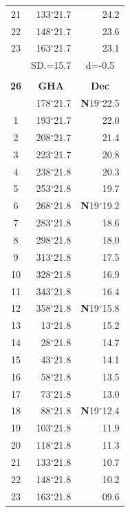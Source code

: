 \documentclass[10pt, a4paper]{report}
\begin{document}
\begin{scriptsize}
\begin{tabular*}{0.2\textwidth}[t]{@{\extracolsep{\fill}}|c|rr|}
21 & 133$^\circ$21.7 & \raisebox{0.24ex}{\boldmath$\cdot$~\boldmath$\cdot$~~}24.2\\
22 & 148$^\circ$21.7 & 23.6\\
23 & 163$^\circ$21.7 & 23.1\\
\hline
\rule{0pt}{2.4ex} & \multicolumn{1}{c}{SD.=15.7} & \multicolumn{1}{c|}{d=-0.5}\\
\hline
\multicolumn{1}{c}{}\\[-0.5ex]\hline
\multicolumn{1}{|c|}{\rule{0pt}{2.6ex}\textbf{26}} & \multicolumn{1}{c}{\textbf{GHA}} & \multicolumn{1}{c|}{\textbf{Dec}}\\
\hline\rule{0pt}{2.6ex}\noindent
0 & 178$^\circ$21.7 & \textbf{N}19$^\circ$22.5\\
1 & 193$^\circ$21.7 & 22.0\\
2 & 208$^\circ$21.7 & 21.4\\
3 & 223$^\circ$21.7 & \raisebox{0.24ex}{\boldmath$\cdot$~\boldmath$\cdot$~~}20.8\\
4 & 238$^\circ$21.8 & 20.3\\
5 & 253$^\circ$21.8 & 19.7\\[2Pt]
6 & 268$^\circ$21.8 & \textbf{N}19$^\circ$19.2\\
7 & 283$^\circ$21.8 & 18.6\\
8 & 298$^\circ$21.8 & 18.0\\
9 & 313$^\circ$21.8 & \raisebox{0.24ex}{\boldmath$\cdot$~\boldmath$\cdot$~~}17.5\\
10 & 328$^\circ$21.8 & 16.9\\
11 & 343$^\circ$21.8 & 16.4\\[2Pt]
12 & 358$^\circ$21.8 & \textbf{N}19$^\circ$15.8\\
13 & 13$^\circ$21.8 & 15.2\\
14 & 28$^\circ$21.8 & 14.7\\
15 & 43$^\circ$21.8 & \raisebox{0.24ex}{\boldmath$\cdot$~\boldmath$\cdot$~~}14.1\\
16 & 58$^\circ$21.8 & 13.5\\
17 & 73$^\circ$21.8 & 13.0\\[2Pt]
18 & 88$^\circ$21.8 & \textbf{N}19$^\circ$12.4\\
19 & 103$^\circ$21.8 & 11.9\\
20 & 118$^\circ$21.8 & 11.3\\
21 & 133$^\circ$21.8 & \raisebox{0.24ex}{\boldmath$\cdot$~\boldmath$\cdot$~~}10.7\\
22 & 148$^\circ$21.8 & 10.2\\
23 & 163$^\circ$21.8 & 09.6\\

\end{tabular*}
\end{scriptsize}
\end{document}
